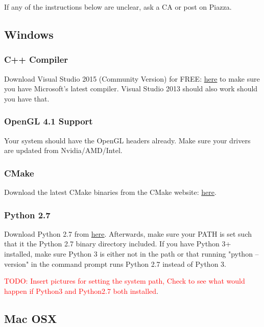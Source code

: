\documentclass{article}
\begin{document}
If any of the instructions below are unclear, ask a CA or post on Piazza.

\subsection*{Windows}

\subsubsection*{C++ Compiler}

Download Visual Studio 2015 (Community Version) for FREE: \href{https://www.visualstudio.com/en-us/products/vs-2015-product-editions.aspx}{here} to make sure you have Microsoft's latest compiler.  Visual Studio 2013 should also work should you have that.

\subsubsection*{OpenGL 4.1 Support}

Your system should have the OpenGL headers already. Make sure your drivers are updated from Nvidia/AMD/Intel.

\subsubsection*{CMake}

Download the latest CMake binaries from the CMake website: \href{http://www.cmake.org/download/}{here}.

\subsubsection*{Python 2.7}

Download Python 2.7 from \href{https://www.python.org/download/releases/2.7/}{here}. Afterwards, make sure your PATH is set such that it the Python 2.7 binary directory included. If you have Python 3+ installed, make sure Python 3 is either not in the path or that running "python --version" in the command prompt runs Python 2.7 instead of Python 3.

\textcolor{red}{TODO: Insert pictures for setting the system path, Check to see what would happen if Python3 and Python2.7 both installed}.

\subsection*{Mac OSX}
\end{document}
